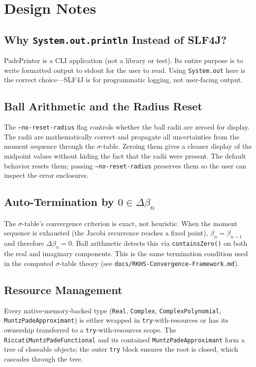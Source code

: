 \documentclass[a4paper,11pt]{article}
\begin{document}
\section{Design Notes}

\subsection{Why \texttt{System.out.println} Instead of SLF4J?}

PadePrinter is a CLI application (not a library or test). Its entire purpose
is to write formatted output to stdout for the user to read. Using
\texttt{System.out} here is the correct choice---SLF4J is for programmatic
logging, not user-facing output.

\subsection{Ball Arithmetic and the Radius Reset}

The \texttt{--no-reset-radius} flag controls whether the ball radii are zeroed
for display. The radii are mathematically correct and propagate all
uncertainties from the moment sequence through the $\sigma$-table. Zeroing them
gives a cleaner display of the midpoint values without hiding the fact that the
radii were present. The default behavior resets them; passing
\texttt{--no-reset-radius} preserves them so the user can inspect the error
enclosures.

\subsection{Auto-Termination by $0 \in \Delta\beta_n$}

The $\sigma$-table's convergence criterion is exact, not heuristic. When the
moment sequence is exhausted (the Jacobi recurrence reaches a fixed point),
$\beta_n = \beta_{n-1}$ and therefore $\Delta\beta_n = 0$. Ball arithmetic
detects this via \texttt{containsZero()} on both the real and imaginary
components. This is the same termination condition used in the computed
$\sigma$-table theory (see \texttt{docs/RKHS-Convergence-Framework.md}).

\subsection{Resource Management}

Every native-memory-backed type (\texttt{Real}, \texttt{Complex},
\texttt{ComplexPolynomial}, \texttt{MuntzPadeApproximant}) is either wrapped in
\texttt{try}-with-resources or has its ownership transferred to a
\texttt{try}-with-resources scope. The \texttt{RiccatiMuntzPadeFunctional} and
its contained \texttt{MuntzPadeApproximant} form a tree of closeable objects;
the outer \texttt{try} block ensures the root is closed, which cascades through
the tree.
\end{document}
